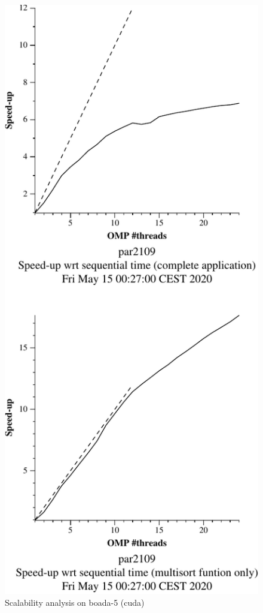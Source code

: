 \begin{figure}[H]
    \begin{minipage}{0.5\textwidth}
        \centering
        \includegraphics[width=0.7\linewidth]{plots/new-omp-tree-cutoff_boada5-crop.pdf}
        \caption{Scalability analysis on boada-5 (cuda)}
        \label{fig:cutoffboada5} 
    \end{minipage}
    \begin{minipage}{0.5\textwidth}
        \centering

\end{minipage}
\end{figure}
